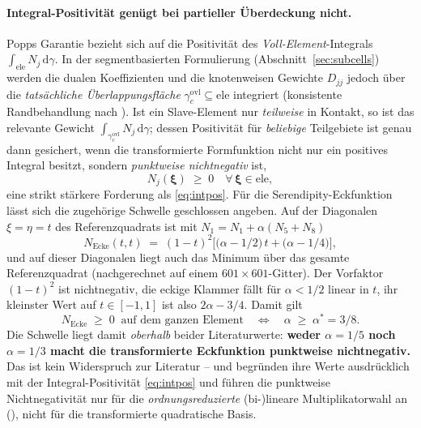 \documentclass[a4paper,11pt]{article}
\def\tfrac#1#2{#1/#2}%
\def\tilde#1{#1}%
\begin{document}
\paragraph{Integral-Positivität genügt bei partieller Überdeckung nicht.}
Popps Garantie bezieht sich auf die Positivität des \emph{Voll-Element}-Integrals
$\int_{\text{ele}}\tilde N_j\,\mathrm d\gamma$. In der segmentbasierten Formulierung
(Abschnitt~\ref{sec:subcells}) werden die dualen Koeffizienten und die knotenweisen Gewichte
$\tilde D_{jj}$ jedoch über die \emph{tatsächliche Überlappungsfläche} $\gamma_c^{\text{ovl}}\subseteq
\text{ele}$ integriert (konsistente Randbehandlung nach \citet{cichosz}). Ist ein Slave-Element
nur \emph{teilweise} in Kontakt, so ist das relevante Gewicht
$\int_{\gamma_c^{\text{ovl}}}\tilde N_j\,\mathrm d\gamma$; dessen Positivität für \emph{beliebige}
Teilgebiete ist genau dann gesichert, wenn die transformierte Formfunktion nicht nur ein positives
Integral besitzt, sondern \emph{punktweise nichtnegativ} ist,
\begin{equation}
\tilde N_j(\boldsymbol\xi) \;\ge\; 0 \quad \forall\,\boldsymbol\xi\in\text{ele},
\label{eq:pointwisepos}
\end{equation}
eine strikt stärkere Forderung als \eqref{eq:intpos}. Für die Serendipity-Eckfunktion lässt sich die
zugehörige Schwelle geschlossen angeben. Auf der Diagonalen $\xi=\eta=t$ des Referenzquadrats ist
mit $\tilde N_1 = N_1+\alpha(N_5+N_8)$
\begin{equation}
\tilde N_{\text{Ecke}}(t,t) \;=\; (1-t)^2\Big[\big(\alpha-\tfrac12\big)\,t + \big(\alpha-\tfrac14\big)\Big],
\label{eq:quad8diag}
\end{equation}
und auf dieser Diagonalen liegt auch das Minimum über das gesamte Referenzquadrat (nachgerechnet
auf einem $601\times601$-Gitter). Der Vorfaktor $(1-t)^2$ ist nichtnegativ, die eckige Klammer fällt
für $\alpha<\tfrac12$ linear in $t$, ihr kleinster Wert auf $t\in[-1,1]$ ist also $2\alpha-\tfrac34$.
Damit gilt
\begin{equation}
\tilde N_{\text{Ecke}}\;\ge\;0 \ \text{ auf dem ganzen Element}
\quad\Longleftrightarrow\quad \alpha\;\ge\;\alpha^\ast=\tfrac38 .
\label{eq:alphastar}
\end{equation}
Die Schwelle liegt damit \emph{oberhalb} beider Literaturwerte: \textbf{weder $\alpha=\tfrac15$ noch
$\alpha=\tfrac13$ macht die transformierte Eckfunktion punktweise nichtnegativ.} Das ist kein
Widerspruch zur Literatur -- \citet{popp2012} und \citet{farah} begründen ihre Werte ausdrücklich
mit der Integral-Positivität \eqref{eq:intpos} und führen die punktweise Nichtnegativität nur für
die \emph{ordnungsreduzierte} (bi-)lineare Multiplikatorwahl an
(\citealp[S.~B429]{popp2012}), nicht für die transformierte quadratische Basis.
\end{document}

